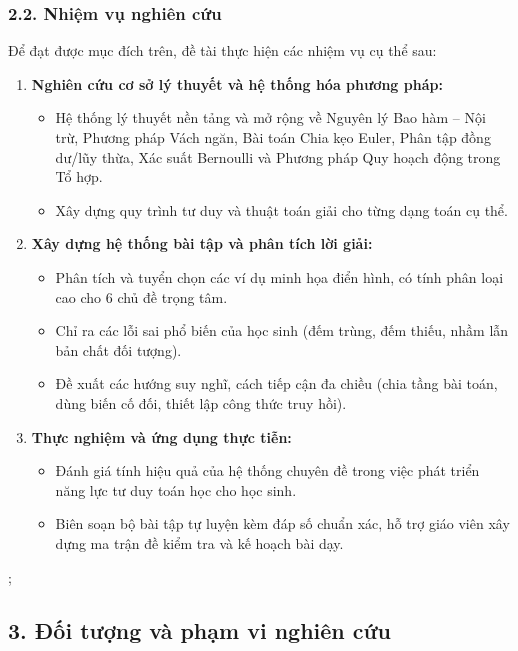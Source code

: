 \documentclass[12pt, a4paper]{article}
\begin{document}
	\subsubsection*{2.2. Nhiệm vụ nghiên cứu}
	Để đạt được mục đích trên, đề tài thực hiện các nhiệm vụ cụ thể sau:
	\begin{enumerate}[label=\textbf{\arabic*.}, leftmargin=*]
		\item \textbf{Nghiên cứu cơ sở lý thuyết và hệ thống hóa phương pháp:}
		\begin{itemize}
			\item Hệ thống lý thuyết nền tảng và mở rộng về Nguyên lý Bao hàm -- Nội trừ, Phương pháp Vách ngăn, Bài toán Chia kẹo Euler, Phân tập đồng dư/lũy thừa, Xác suất Bernoulli và Phương pháp Quy hoạch động trong Tổ hợp.
			\item Xây dựng quy trình tư duy và thuật toán giải cho từng dạng toán cụ thể.
		\end{itemize}
		
		\item \textbf{Xây dựng hệ thống bài tập và phân tích lời giải:}
		\begin{itemize}
			\item Phân tích và tuyển chọn các ví dụ minh họa điển hình, có tính phân loại cao cho 6 chủ đề trọng tâm.
			\item Chỉ ra các lỗi sai phổ biến của học sinh (đếm trùng, đếm thiếu, nhầm lẫn bản chất đối tượng).
			\item Đề xuất các hướng suy nghĩ, cách tiếp cận đa chiều (chia tầng bài toán, dùng biến cố đối, thiết lập công thức truy hồi).
		\end{itemize}
		
		\item \textbf{Thực nghiệm và ứng dụng thực tiễn:}
		\begin{itemize}
			\item Đánh giá tính hiệu quả của hệ thống chuyên đề trong việc phát triển năng lực tư duy toán học cho học sinh.
			\item Biên soạn bộ bài tập tự luyện kèm đáp số chuẩn xác, hỗ trợ giáo viên xây dựng ma trận đề kiểm tra và kế hoạch bài dạy.
		\end{itemize}
		\end{enumerate};			
			\subsection*{3. Đối tượng và phạm vi nghiên cứu}			
\end{document}
